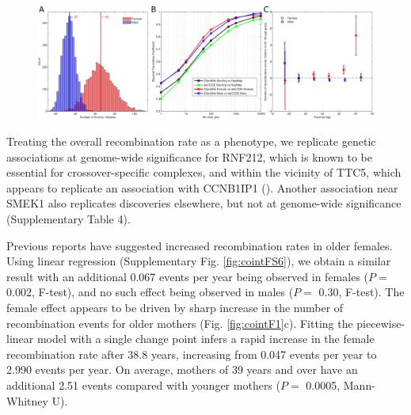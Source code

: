 \begin{figure}[h]
    \includegraphics[width=\textwidth]{cointEscape/figs/Figure1.png}
    \vspace{-20pt}
\end{figure}

Treating the overall recombination rate as a phenotype, we
replicate genetic associations at genome-wide significance for
RNF212, which is known to be essential for crossover-specific
complexes\cite{Reynolds2013}, and within the vicinity of TTC5, which appears
to replicate an association with CCNB1IP1 (\citet{Kong2014}). Another
association near SMEK1 also replicates discoveries elsewhere\cite{Kong2014},
but not at genome-wide significance (Supplementary Table 4).

Previous reports have suggested increased recombination rates
in older females\cite{Kong2004,Coop2008}. Using linear regression (Supplementary
Fig. \ref{fig:cointFS6}), we obtain a similar result with an additional 0.067
events per year being observed in females ($P=$ 0.002, F-test), and
no such effect being observed in males ($P=$ 0.30, F-test). The
female effect appears to be driven by sharp increase in the
number of recombination events for older mothers (Fig. \ref{fig:cointF1}c).
Fitting the piecewise-linear model with a single change point
infers a rapid increase in the female recombination rate after 38.8
years, increasing from 0.047 events per year to 2.990 events per
year. On average, mothers of 39 years and over have an additional
2.51 events compared with younger mothers ($P=$ 0.0005,
Mann-Whitney U).

